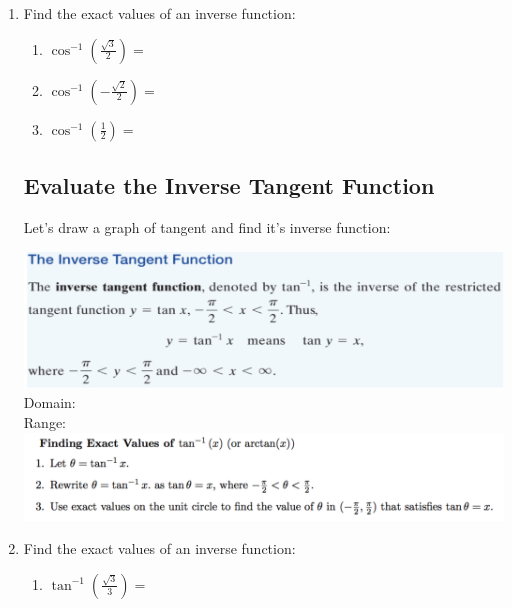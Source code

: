 \begin{enumerate}
\vspace{-.1in}
\item Find the exact values of an inverse function:
 \begin{enumerate}
\item $\displaystyle \cos^{-1}\left(\frac{\sqrt{3}}{2}\right)=$\\[.5in]

\item $\displaystyle \cos^{-1}\left(-\frac{\sqrt{2}}{2}\right)=$\\[.5in]

\item $\displaystyle \cos^{-1}\left(\frac{1}{2}\right)=$\\[.5in]

\end{enumerate}




\subsection{Evaluate the Inverse Tangent Function}

Let's draw a graph of tangent and find it's inverse function:
\vfill

\includegraphics[scale=.7]{tangentinverse}\\
\noindent Domain:\\[.5in]
\noindent Range:\\

\newpage
\includegraphics[scale=.7]{findingtangentinverse}\\




\vspace{-.1in}
\item Find the exact values of an inverse function:
 \begin{enumerate}
\item $\displaystyle \tan^{-1}\left(\frac{\sqrt{3}}{3}\right)=$\\[.5in]


\end{enumerate}
\end{enumerate}
